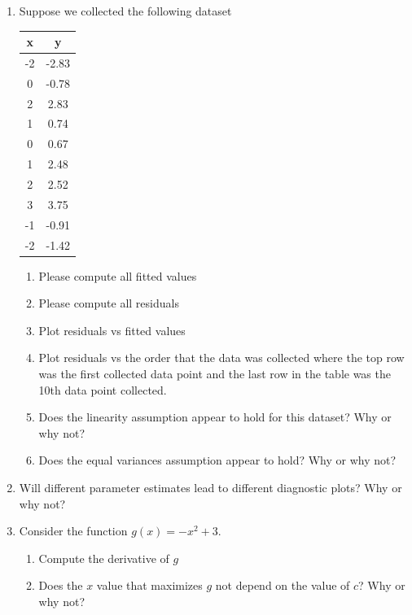 \begin{enumerate}
    \item Suppose we collected the following dataset
    \begin{table}[ht!]
        \centering
        \begin{tabular}{c|c}
            x & y \\
            \hline
            -2  & -2.83  \\ 
            0   &  -0.78 \\ 
            2   &  2.83  \\ 
            1   &  0.74  \\ 
            0   &  0.67  \\ 
            1   &  2.48  \\ 
            2   &  2.52  \\ 
            3   &  3.75  \\ 
            -1  &  -0.91 \\ 
            -2  &  -1.42 \\ 
        \end{tabular}
    \end{table}
    \begin{enumerate}
        \item Please compute all fitted values
        \item Please compute all residuals
        \item Plot residuals vs fitted values
        \item Plot residuals vs the order that the data was collected where the top row was the first collected data point and the last row in the table was the 10th data point collected. 
        \item Does the linearity assumption appear to hold for this dataset? Why or why not?
        \item Does the equal variances assumption appear to hold? Why or why not?
    \end{enumerate}
    
    \item Will different parameter estimates lead to different diagnostic plots? Why or why not?
    
    
    
    \item Consider the function $g(x) = -x^{2} + 3$. 
    \begin{enumerate}
        \item Compute the derivative of $g$
        \item Does the $x$ value that maximizes $g$ not depend on the value of $c$? Why or why not?
    \end{enumerate}


\end{enumerate}
